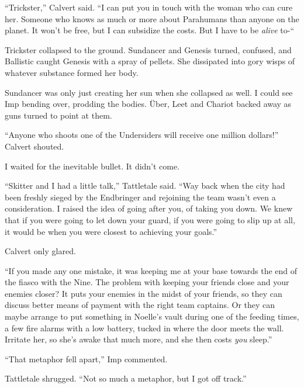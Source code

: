 ``Trickster,'' Calvert said.  ``I can put you in touch with the woman who can cure her.  Someone who knows as much or more about Parahumans than anyone on the planet.  It won't be free, but I can subsidize the costs.  But I have to be \emph{alive} to-``



Trickster collapsed to the ground.  Sundancer and Genesis turned, confused, and Ballistic caught Genesis with a spray of pellets.  She dissipated into gory wisps of whatever substance formed her body.



Sundancer was only just creating her sun when she collapsed as well.  I could see Imp bending over, prodding the bodies.  \"{U}ber, Leet and Chariot backed away as guns turned to point at them.



``Anyone who shoots one of the Undersiders will receive one million dollars!''  Calvert shouted.



I waited for the inevitable bullet.  It didn't come.



``Skitter and I had a little talk,'' Tattletale said.  ``Way back when the city had been freshly sieged by the Endbringer and rejoining the team wasn't even a consideration.  I raised the idea of going after you, of taking you down.  We knew that if you were going to let down your guard, if you were going to slip up at all, it would be when you were closest to achieving your goals.''



Calvert only glared.



``If you made any one mistake, it was keeping me at your base towards the end of the fiasco with the Nine.  The problem with keeping your friends close and your enemies closer?  It puts your enemies in the midst of your friends, so they can discuss better means of payment with the right team captains.  Or they can maybe arrange to put something in Noelle's vault during one of the feeding times, a few fire alarms with a low battery, tucked in where the door meets the wall.  Irritate her, so she's awake that much more, and she then costs \emph{you} sleep.''



``That metaphor fell apart,'' Imp commented.



Tattletale shrugged.  ``Not so much a metaphor, but I got off track.''



